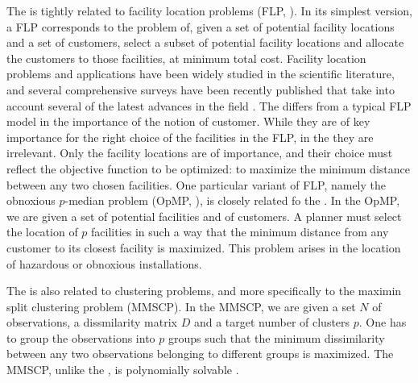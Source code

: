 \documentclass[ijoo,nonblindrev]{informs-ijoo}
\begin{document}
The \pDP{} is tightly related to facility location problems (FLP, \citet{Laporte2015Location}). In its simplest version, a FLP corresponds to the problem of, given a set of potential facility locations and a set of customers, select a subset of potential facility locations and allocate the customers to those facilities, at minimum total cost. Facility location problems and applications have been widely studied in the scientific literature, and several comprehensive surveys have been recently published that take into account several of the latest advances in the field \citep{Laporte2015Location, Melo2009Facility}. The \pDP{} differs from a typical FLP model in the importance of the notion of customer. While they are of key importance for the right choice of the facilities in the FLP, in the \pDP{} they are irrelevant. Only the facility locations are of importance, and their choice must reflect the objective function to be optimized: to maximize the minimum distance between any two chosen facilities. One particular variant of FLP, namely the obnoxious $p$-median problem (OpMP, \citet{Belotti2006branch}), is closely related fo the \pDP{}. In the OpMP, we are given a set of potential facilities and of customers. A planner must select the location of $p$ facilities in such a way that the minimum distance from any customer to its closest facility is maximized. This problem arises in the location of hazardous or obnoxious installations.

The \pDP{} is also related to clustering problems, and more specifically to the maximin split clustering problem (MMSCP). In the MMSCP, we are given a set $N$ of observations, a dissmilarity matrix $D$ and a target number of clusters $p$. One has to group the observations into $p$ groups such that the minimum dissimilarity between any two observations belonging to different groups is maximized. The MMSCP, unlike the \pDP{}, is polynomially solvable \citep{Delattre1980Bicriterion}.
\end{document}
